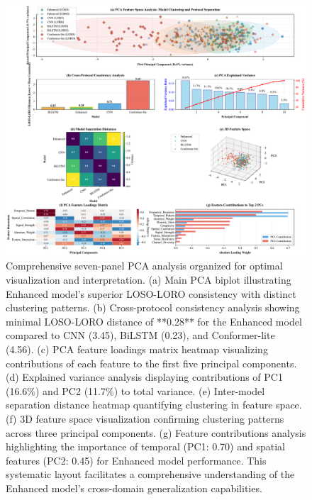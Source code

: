 \documentclass[journal]{IEEEtran}
\begin{document}
\begin{figure}[ht]
\centering
\includegraphics[width=\linewidth]{figures/fig6_pca_analysis.pdf}
\caption{Comprehensive seven-panel PCA analysis organized for optimal visualization and interpretation. 
(a) Main PCA biplot illustrating Enhanced model's superior LOSO-LORO consistency with distinct clustering patterns. 
(b) Cross-protocol consistency analysis showing minimal LOSO-LORO distance of **0.28** for the Enhanced model compared to CNN (3.45), BiLSTM (0.23), and Conformer-lite (4.56). 
(c) PCA feature loadings matrix heatmap visualizing contributions of each feature to the first five principal components. 
(d) Explained variance analysis displaying contributions of PC1 (16.6\%) and PC2 (11.7\%) to total variance. 
(e) Inter-model separation distance heatmap quantifying clustering in feature space. 
(f) 3D feature space visualization confirming clustering patterns across three principal components. 
(g) Feature contributions analysis highlighting the importance of temporal (PC1: 0.70) and spatial features (PC2: 0.45) for Enhanced model performance. 
This systematic layout facilitates a comprehensive understanding of the Enhanced model's cross-domain generalization capabilities.}

\end{figure}
\end{document}
